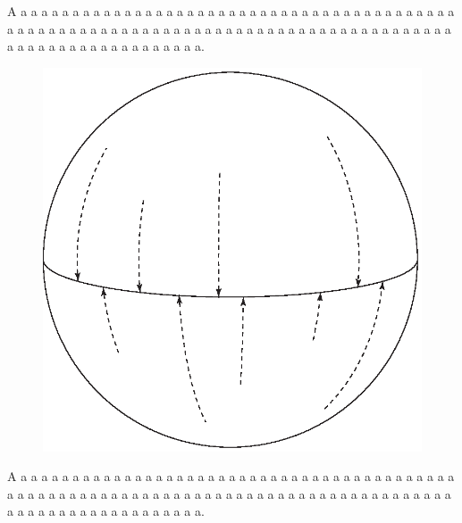 \documentclass{article}
\begin{document}
A a a a a a a a a a a a a a a a a a a a a a a a a a a a a a a a a a a
a a a a a a a a a a a a a a a a a a a a a a a a a a a a a a a a a a a
a a a a a a a a a a a a a a a a a a a a a a a a a a a a a a a a a a a.
\begin{figure}[h]
\includegraphics{pfbincl.eps}
\end{figure}
A a a a a a a a a a a a a a a a a a a a a a a a a a a a a a a a a a a
a a a a a a a a a a a a a a a a a a a a a a a a a a a a a a a a a a a
a a a a a a a a a a a a a a a a a a a a a a a a a a a a a a a a a a a.
\end{document}
